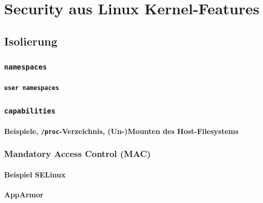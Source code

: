 \documentclass[11pt,a4paper,oneside]{report}
\begin{document}
\chapter{Security aus Linux Kernel-Features}
	\section{Isolierung}
		\subsection{\texttt{namespaces}}
			\subsubsection{\texttt{user namespaces}}
		\subsection{\texttt{capabilities}}
			\subsubsection{Beispiele, \texttt{/proc}-Verzeichnis, (Un-)Mounten des Host-Filesystems}
		\subsection{Mandatory Access Control (MAC)}
			\subsubsection{Beispiel SELinux}
      \subsubsection{AppArmor}
\end{document}
